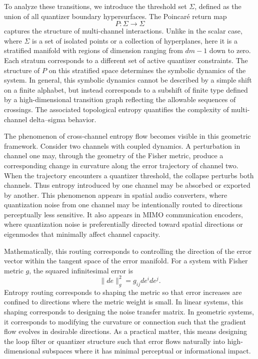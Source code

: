 To analyze these transitions, we introduce the threshold set \(\Sigma\), defined as the union of all quantizer boundary hypersurfaces. The Poincaré return map
\[
P: \Sigma \to \Sigma
\]
captures the structure of multi-channel interactions. Unlike in the scalar case, where \(\Sigma\) is a set of isolated points or a collection of hyperplanes, here it is a stratified manifold with regions of dimension ranging from \(dm - 1\) down to zero. Each stratum corresponds to a different set of active quantizer constraints. The structure of \(P\) on this stratified space determines the symbolic dynamics of the system. In general, this symbolic dynamics cannot be described by a simple shift on a finite alphabet, but instead corresponds to a subshift of finite type defined by a high-dimensional transition graph reflecting the allowable sequences of crossings. The associated topological entropy quantifies the complexity of multi-channel delta--sigma behavior.

The phenomenon of cross-channel entropy flow becomes visible in this geometric framework. Consider two channels with coupled dynamics. A perturbation in channel one may, through the geometry of the Fisher metric, produce a corresponding change in curvature along the error trajectory of channel two. When the trajectory encounters a quantizer threshold, the collapse perturbs both channels. Thus entropy introduced by one channel may be absorbed or exported by another. This phenomenon appears in spatial audio converters, where quantization noise from one channel may be intentionally routed to directions perceptually less sensitive. It also appears in MIMO communication encoders, where quantization noise is preferentially directed toward spatial directions or eigenmodes that minimally affect channel capacity.

Mathematically, this routing corresponds to controlling the direction of the error vector within the tangent space of the error manifold. For a system with Fisher metric \(g\), the squared infinitesimal error is
\[
\| de \|^{2}_{g} = g_{ij} de^{i} de^{j}.
\]
Entropy routing corresponds to shaping the metric so that error increases are confined to directions where the metric weight is small. In linear systems, this shaping corresponds to designing the noise transfer matrix. In geometric systems, it corresponds to modifying the curvature or connection such that the gradient flow evolves in desirable directions. As a practical matter, this means designing the loop filter or quantizer structure such that error flows naturally into high-dimensional subspaces where it has minimal perceptual or informational impact.

